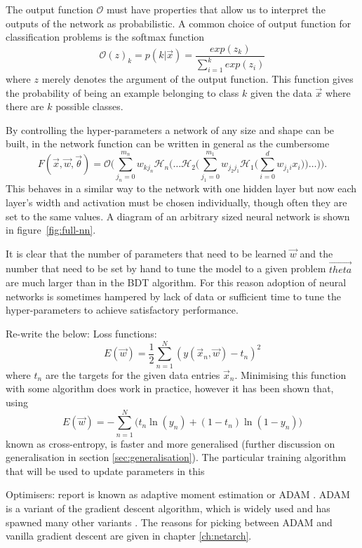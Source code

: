 The output function $\mathcal{O}$ must have properties that allow us to
interpret the outputs of the network as probabilistic. A common choice of output
function for classification problems is the softmax function
\begin{equation}
  \mathcal{O}(z)_k = p(k|\vec{x}) = \frac{exp(z_k)}{\sum_{i=1}^kexp(z_i)}
  \label{eq:softmax}
\end{equation}
where $z$ merely denotes the argument of the output function. This function
gives the probability of being an example belonging to class $k$ given the data
$\vec{x}$ where there are $k$ possible classes.

By controlling the hyper-parameters a network of any size and shape can be
built, in the network function can be written in general as the cumbersome
\begin{equation}
  F(\vec{x}, \vec{w}, \vec{\theta}) = \mathcal{O} \Bigg( \sum_{j_{n}=0}^{m_{n}} w_{kj_{n}}
  \mathcal{H}_{n} \Bigg( \dots \mathcal{H}_2  \Bigg( \sum_{j_{1}=0}^{m_{1}} w_{j_{2}j_{1}} 
  \mathcal{H}_{1} \Bigg( \sum_{i=0}^{d} w_{j_{1}i} x_{i} \Bigg) \Bigg) \dots \Bigg) \Bigg).
  \label{eq:fullnn}
\end{equation}
This behaves in a similar way to the network with one hidden layer but now each
layer's width and activation must be chosen individually, though often they are
set to the same values. A diagram of an arbitrary sized neural network is shown
in figure~\ref{fig:full-nn}.

It is clear that the number of parameters that need to be learned $\vec{w}$ and
the number that need to be set by hand to tune the model to a given problem
$\vec{theta}$ are much larger than in the BDT algorithm. For this reason
adoption of neural networks is sometimes hampered by lack of data or sufficient
time to tune the hyper-parameters to achieve satisfactory performance.

Re-write the below:
Loss functions:
\begin{equation}
E(\vec{w}) = \frac{1}{2}\sum_{n=1}^{N}(y(\vec{x}_n, \vec{w}) - t_n)^2
\label{eq:sumofsquares}
\end{equation}
where $t_n$ are the targets for the given data entries $\vec{x}_n$.
Minimising this function with some algorithm does work in practice, however it
has been shown that, using
\begin{equation}
E(\vec{w}) = - \sum_{n=1}^{N} \Bigg (t_n \ln (y_n) + (1-t_n) \ln (1-y_n) \Bigg)
\label{eq:xentropy}
\end{equation}
known as cross-entropy, is faster and more generalised \cite{XEntropySimard}
(further discussion on generalisation in section \ref{sec:generalisation}). The
particular training algorithm that will be used to update parameters in this

Optimisers:
report is known as adaptive moment estimation or ADAM \cite{ADAMOpt}. ADAM is a
variant of the gradient descent algorithm, which is widely used and has spawned
many other variants \cite{GDOverview}. The reasons for picking between ADAM and
vanilla gradient descent are given in chapter \ref{ch:netarch}.



